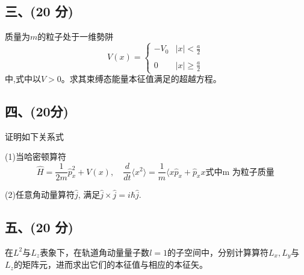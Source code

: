 \subsection{三、(20 分) }
质量为$m$的粒子处于一维勢阱
$$V(x) = 
\begin{cases} 
-V_0 & |x| < \frac{a}{2} \\\\
0 &  |x| \geq \frac{a}{2} 
\end{cases}~
$$
中,式中以$V>0$。求其束缚态能量本征值满足的超越方程。
\subsection{四、(20分) }
证明如下关系式

(1)当哈密顿算符$$\hat{H} = \frac{1}{2m}\hat{p}_x^2 + V(x), \quad \frac{d}{dt} \langle x^2 \rangle = \frac{1}{m} \langle x \hat{p}_x + \hat{p}_x x \text{式中m 为粒子质量}~$$ 

(2)任意角动量算符$\hat{j}$, 满足$\hat{j} \times \hat{j} = i\hbar \hat{j}$.


\subsection{五、(20 分)}
在$L^2$与$L_z$表象下，在轨道角动量量子数$l=1$的子空间中，分别计算算符$L_x,L_y$与$L_z$的矩阵元，进而求出它们的本征值与相应的本征矢。